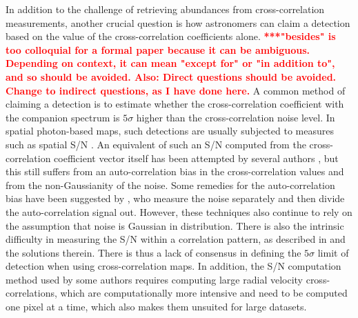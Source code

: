 \documentclass{aa}
\begin{document}
In addition to  the challenge of retrieving abundances from cross-correlation measurements, another crucial question is how  astronomers can claim a detection based on the value of the cross-correlation coefficients alone.
\textcolor{red}{\textbf{***"besides" is too colloquial for a formal paper because it
can  be ambiguous. Depending on context, it can mean "except for" or
"in addition to", and so should be avoided. Also: Direct questions should be avoided. Change to indirect questions, as I have done here.    }}
A common method of claiming a detection is to estimate whether the cross-correlation coefficient with the companion spectrum is $5\sigma$ higher than the cross-correlation noise level.
In spatial photon-based maps, such detections are usually subjected to measures such as spatial S/N \citep[][]{2014MawetSNR}.
An equivalent of such an S/N computed from the cross-correlation coefficient vector itself has been attempted by several authors \citep[e.g.][]{2018AHoeijmakersMM}, but this still suffers from an auto-correlation bias in the cross-correlation values and from the non-Gaussianity of the noise.
Some remedies for the  auto-correlation bias have been suggested by \citet[][]{ruffio2019radial}, who measure the noise separately and then divide the auto-correlation signal out.
However, these techniques also continue to rely on the assumption that noise is Gaussian in distribution.
There is also the intrinsic difficulty in measuring the S/N within a correlation pattern, as described in \cite{2023Malin} and the solutions therein. There is thus a lack of consensus in defining the $5\sigma$ limit of detection when using cross-correlation maps.
In addition, the S/N computation method used by some authors  \citep[e.g. in][]{2021Cugno} requires computing large radial velocity cross-correlations, which are computationally more intensive and need to be computed one pixel at a time, which also makes them unsuited for large datasets.
\end{document}
